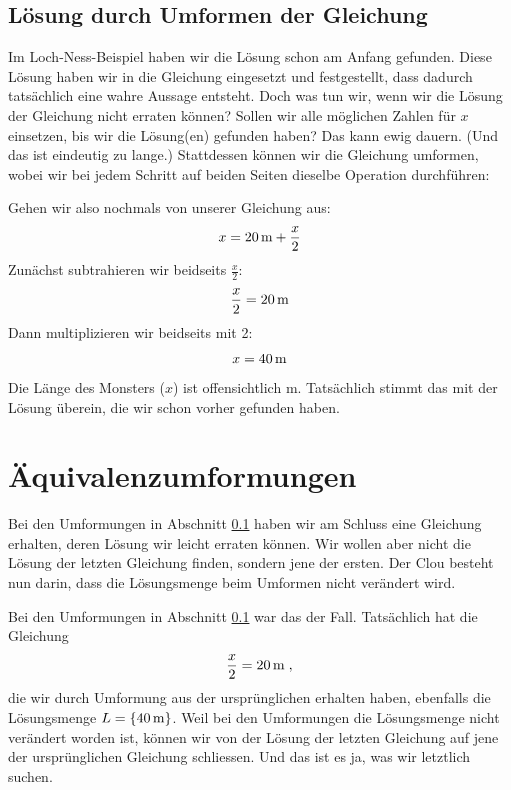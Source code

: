 \documentclass[%
11pt,%
twoside,%
titlepage,%
german,%
]{scrartcl}
\begin{document}
\subsection{L\"osung durch Umformen der Gleichung}
\label{lingl:umformen}

Im Loch-Ness-Beispiel haben wir die L\"osung schon am Anfang gefunden. Diese L\"osung haben wir in die Gleichung eingesetzt und festgestellt, dass dadurch tats\"achlich eine wahre Aussage entsteht. Doch was tun wir, wenn wir die L\"osung der Gleichung nicht erraten k\"onnen? Sollen wir alle m\"oglichen Zahlen f\"ur $x$ einsetzen, bis wir die L\"osung(en) gefunden haben? Das kann ewig dauern. (Und das ist eindeutig zu lange.) Stattdessen k\"onnen wir die Gleichung umformen, wobei wir bei jedem Schritt auf beiden Seiten dieselbe Operation durchf\"uhren:

Gehen wir also nochmals von unserer Gleichung aus:
\begin{displaymath}
  x = \unit[20]{m} + \frac{x}{2}
\end{displaymath}
Zun\"achst subtrahieren wir beidseits $\frac{x}{2}$:
\begin{displaymath}
  \frac{x}{2} = \unit[20]{m}
\end{displaymath}
Dann multiplizieren wir beidseits mit 2:
\begin{displaymath}
  x = \unit[40]{m}
\end{displaymath}
Die L\"ange des Monsters ($x$) ist offensichtlich \unit[40]{m}. Tats\"achlich stimmt das mit der L\"osung \"uberein, die wir schon vorher gefunden haben.



\section{\"Aquivalenzumformungen}
\label{lingl:equiv}

Bei den Umformungen in Abschnitt \ref{lingl:umformen} haben wir am Schluss eine Gleichung erhalten, deren L\"osung wir leicht erraten k\"onnen. Wir wollen aber nicht die L\"osung der letzten Gleichung finden, sondern jene der ersten. Der Clou besteht nun darin, dass die L\"osungsmenge beim Umformen nicht ver\"andert wird.

Bei den Umformungen in Abschnitt \ref{lingl:umformen} war das der Fall. Tats\"achlich hat die Gleichung
\begin{displaymath}
  \frac{x}{2} = \unit[20]{m}  \; ,
\end{displaymath}
die wir durch Umformung aus der urspr\"unglichen erhalten haben, ebenfalls die L\"osungsmenge $L=\{\unit[40]{m}\}$. Weil bei den Umformungen die L\"osungsmenge nicht ver\"andert worden ist, k\"onnen wir von der L\"osung der letzten Gleichung auf jene der urspr\"unglichen Gleichung schliessen. Und das ist es ja, was wir letztlich suchen.
\end{document}
